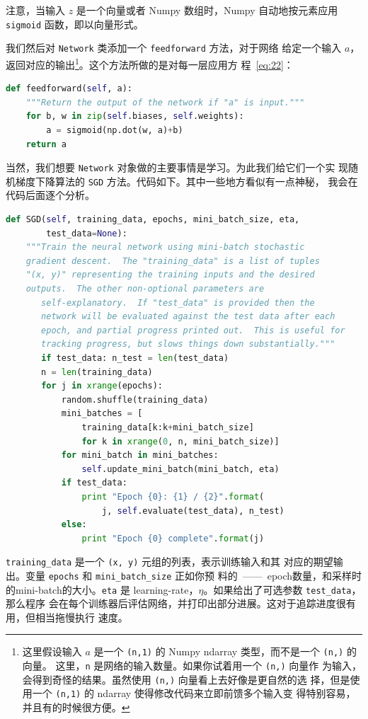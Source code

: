 注意，当输入 $z$ 是一个向量或者 Numpy 数组时，Numpy 自动地按元素应用
\lstinline!sigmoid! 函数，即以向量形式。

我们然后对 \lstinline!Network! 类添加一个 \lstinline!feedforward! 方法，对于网络
给定一个输入 $a$，返回对应的输出\footnote{这里假设输入 $a$ 是一个
  \lstinline!(n,1)! 的 Numpy ndarray 类型，而不是一个 \lstinline!(n,)! 的向量。
  这里，\lstinline!n! 是网络的输入数量。如果你试着用一个 \lstinline!(n,)! 向量作
  为输入，会得到奇怪的结果。虽然使用 \lstinline!(n,)! 向量看上去好像是更自然的选
  择，但是使用一个 \lstinline!(n,1)! 的 ndarray 使得修改代码来立即前馈多个输入变
  得特别容易，并且有的时候很方便。}。这个方法所做的是对每一层应用方
程~\eqref{eq:22}：
\begin{lstlisting}[language=Python]
def feedforward(self, a):
    """Return the output of the network if "a" is input."""
    for b, w in zip(self.biases, self.weights):
        a = sigmoid(np.dot(w, a)+b)
    return a
\end{lstlisting}

当然，我们想要 \lstinline!Network! 对象做的主要事情是学习。为此我们给它们一个实
现随机梯度下降算法的 \lstinline!SGD! 方法。代码如下。其中一些地方看似有一点神秘，
我会在代码后面逐个分析。
\begin{lstlisting}[language=Python]
def SGD(self, training_data, epochs, mini_batch_size, eta,
        test_data=None):
    """Train the neural network using mini-batch stochastic
    gradient descent.  The "training_data" is a list of tuples
    "(x, y)" representing the training inputs and the desired
    outputs.  The other non-optional parameters are
       self-explanatory.  If "test_data" is provided then the
       network will be evaluated against the test data after each
       epoch, and partial progress printed out.  This is useful for
       tracking progress, but slows things down substantially."""
       if test_data: n_test = len(test_data)
       n = len(training_data)
       for j in xrange(epochs):
           random.shuffle(training_data)
           mini_batches = [
               training_data[k:k+mini_batch_size]
               for k in xrange(0, n, mini_batch_size)]
           for mini_batch in mini_batches:
               self.update_mini_batch(mini_batch, eta)
           if test_data:
               print "Epoch {0}: {1} / {2}".format(
                   j, self.evaluate(test_data), n_test)
           else:
               print "Epoch {0} complete".format(j)
\end{lstlisting}

\lstinline!training_data! 是一个 \lstinline!(x, y)! 元组的列表，表示训练输入和其
对应的期望输出。变量 \lstinline!epochs! 和 \lstinline!mini_batch_size! 正如你预
料的~——~\gls*{epoch}数量，和采样时的\gls*{mini-batch}{}的大小。\lstinline!eta! 是%
\gls*{learning-rate}，$\eta$。如果给出了可选参数 \lstinline!test_data!，那么程序
会在每个训练器后评估网络，并打印出部分进展。这对于追踪进度很有用，但相当拖慢执行
速度。

